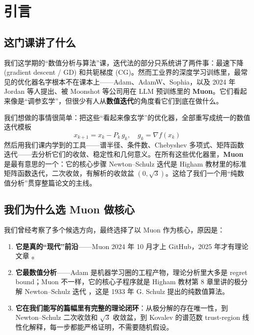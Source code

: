 \section{引言}

\subsection{这门课讲了什么}

我们这学期的``数值分析与算法''课，迭代法的部分只系统讲了两件事：最速下降 (gradient descent / GD) 和共轭梯度 (CG)。然而工业界的深度学习训练里，最常见的优化器名字根本不在课本上——Adam、AdamW、Sophia，以及 2024 年 Jordan 等人提出、被 Moonshot 等公司用在 LLM 预训练里的 \textbf{Muon}。它们看起来像是``调参玄学''，但很少有人从\textbf{数值迭代}的角度看它们到底在做什么。

我们想做的事情很简单：把这些``看起来像玄学''的优化器，全部重写成统一的数值迭代模板
\begin{equation}
  \boxed{\; x_{k+1} = x_k - P_k\, g_k, \quad g_k = \nabla f(x_k) \;}
  \label{eq:unified}
\end{equation}
然后用我们课内学到的工具——谱半径、条件数、Chebyshev 多项式、矩阵函数迭代——去分析它们的收敛、稳定性和几何意义。在所有这些优化器里，\textbf{Muon} 是最有意思的一个：它的核心步骤 Newton--Schulz 迭代是 Higham 教材里的标准矩阵函数迭代，二次收敛，有解析的收敛盆 $(0,\sqrt 3)$。这给了我们一个用``纯数值分析''贯穿整篇论文的主线。

\subsection{我们为什么选 Muon 做核心}

我们曾经考察了多个候选方向，最终选择了以 Muon 作为核心，原因是：
\begin{enumerate}[nosep]
  \item \textbf{它是真的``现代''前沿}——Muon 2024 年 10 月才上 GitHub，2025 年才有理论文章 \cite{kovalev2025,liu2025muon}。
  \item \textbf{它最数值分析}——Adam 是机器学习圈的工程产物，理论分析里大多是 regret bound；Muon 不一样，它的核心子程序就是 Higham 教材第 8 章里讲的极分解 Newton--Schulz 迭代 \cite{higham2008,schulz1933}，这是 1933 年 G. Schulz 提出的纯数值算法。
  \item \textbf{它在我们能写的篇幅里有完整的理论闭环}：从极分解的存在唯一性，到 Newton--Schulz 二次收敛和 $\sqrt 3$ 收敛盆，到 Kovalev 的谱范数 trust-region 线性化解释，每一步都能严格证明，不需要随机假设。
\end{enumerate}


